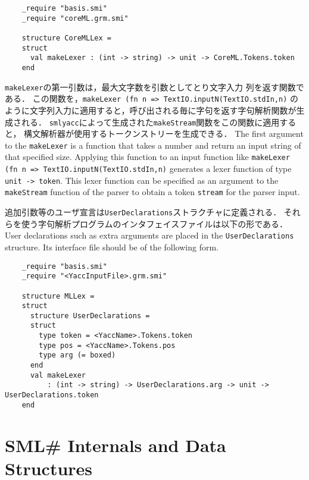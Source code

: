 \documentclass{jbook}
\newcommand{\txt}[2]{#2}
\newcommand{\smlsharp}{SML\#}
\newcommand{\code}[1]{\mbox{\large\tt #1}}
\begin{document}
\begin{verbatim}
    _require "basis.smi"
    _require "coreML.grm.smi"
    
    structure CoreMLLex =
    struct
      val makeLexer : (int -> string) -> unit -> CoreML.Tokens.token
    end
\end{verbatim}
\ifjp%
	\code{makeLexer}の第一引数は，最大文字数を引数としてとり文字入力
列を返す関数である．
	この関数を，\code{makeLexer (fn n => TextIO.inputN(TextIO.stdIn,n)}
のように文字列入力に適用すると，呼び出される毎に字句を返す字句解析関数が生成される．
	\code{smlyacc}によって生成された\code{makeStream}関数をこの関数に適用すると，
構文解析器が使用するトークンストリーを生成できる．
\else%
	The first argument to the \code{makeLexer} is a function that
takes a number and return an input string of that specified size.
	Applying this function to an input function like
\code{makeLexer (fn n => TextIO.inputN(TextIO.stdIn,n)}
generates a lexer function of type \code{unit -> token}.
	This lexer function can be specified as an argument to the 
\code{makeStream} function of the parser to obtain a token
\code{stream} for the parser input.
\fi%


\ifjp%
	追加引数等のユーザ宣言は\code{UserDeclarations}ストラクチャに定義される．
	それらを使う字句解析プログラムのインタフェイスファイルは以下の形である．
\else%
	User declarations such as extra arguments are placed in the
\code{UserDeclarations} structure.
	Its interface file should be of the following form.
\fi%

\begin{verbatim}
    _require "basis.smi"
    _require "<YaccInputFile>.grm.smi"
    
    structure MLLex =
    struct
      structure UserDeclarations =
      struct
        type token = <YaccName>.Tokens.token
        type pos = <YaccName>.Tokens.pos
        type arg (= boxed)
      end
      val makeLexer
          : (int -> string) -> UserDeclarations.arg -> unit -> UserDeclarations.token
    end
\end{verbatim}

\part{\txt{\smlsharp{}の内部構造}{\smlsharp{} Internals and Data Structures}}
\label{part:internals}
\end{document}
